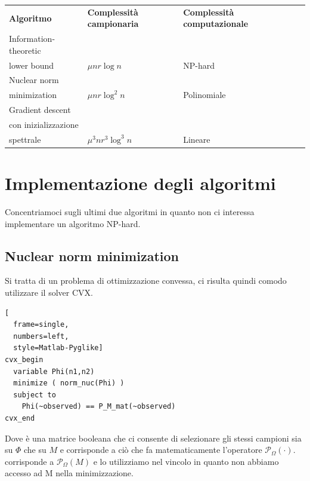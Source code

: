\documentclass[12pt,a4paper]{report}
\begin{document}
\begin{table}[H]
  \centering
  \begin{tabular}{@{}lllll@{}}
    \cmidrule(r){1-3}
    \textbf{Algoritmo}                              & \textbf{Complessità campionaria} & \textbf{Complessità computazionale} &  &  \\ \cmidrule(r){1-3}
    Information-theoretic\\ lower bound               & $\mu n r \log n$                    & NP-hard                           &  &  \\ \cmidrule(r){1-3}
    Nuclear norm\\ minimization                       & $\mu n r \log^2 n$                  & Polinomiale                   &  &  \\ \cmidrule(r){1-3}
    Gradient descent\\ con inizializzazione\\ spettrale & $\mu^3 n r^3 \log^3 n$              & Lineare                       &  &  \\ \cmidrule(r){1-3}
  \end{tabular}
\end{table}


\chapter{Implementazione degli algoritmi}

Concentriamoci sugli ultimi due algoritmi in quanto
non ci interessa implementare un algoritmo NP-hard.

\section{Nuclear norm minimization}

Si tratta di un problema di ottimizzazione convessa,
ci risulta quindi comodo utilizzare il solver CVX.\\
\begin{lstlisting}[
  frame=single,
  numbers=left,
  style=Matlab-Pyglike]
cvx_begin
  variable Phi(n1,n2)
  minimize ( norm_nuc(Phi) )
  subject to
    Phi(~observed) == P_M_mat(~observed)
cvx_end
\end{lstlisting}
Dove  è una matrice booleana
che ci consente di selezionare
gli stessi campioni sia su $\Phi$ che su $M$
e corrisponde a ciò che fa matematicamente l'operatore
$\mathcal{P}_{\Omega}(\cdot)$.
 corrisponde a $\mathcal{P}_{\Omega}(M)$
e lo utilizziamo nel vincolo in quanto non abbiamo accesso ad M
nella minimizzazione.
\end{document}
